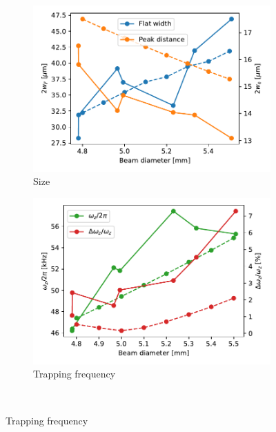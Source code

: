 \begin{figure}
    \begin{subfigure}{0.5\textwidth}
        \includegraphics[width=\textwidth]{chapters/chapter_3/figures/size_focus+sim.pdf}
        \caption{Size}
        \label{fig:diam_size}
    \end{subfigure}
    \begin{subfigure}{0.5\textwidth}
        \includegraphics[width=\textwidth]{chapters/chapter_3/figures/trapp_freq_focus+sim.pdf}
        \caption{Trapping frequency}
        \label{fig:diam_trap}
    \end{subfigure}\\


\end{figure}
